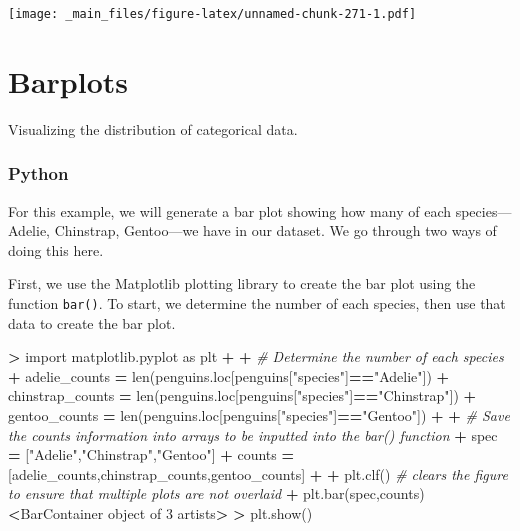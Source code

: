 \documentclass[
]{book}
\newenvironment{Shaded}{\begin{snugshade}}{\end{snugshade}}
\newcommand{\BuiltInTok}[1]{#1}
\newcommand{\CommentTok}[1]{\textcolor[rgb]{0.56,0.35,0.01}{\textit{#1}}}
\newcommand{\DecValTok}[1]{\textcolor[rgb]{0.00,0.00,0.81}{#1}}
\newcommand{\ImportTok}[1]{#1}
\newcommand{\NormalTok}[1]{#1}
\newcommand{\OperatorTok}[1]{\textcolor[rgb]{0.81,0.36,0.00}{\textbf{#1}}}
\newcommand{\StringTok}[1]{\textcolor[rgb]{0.31,0.60,0.02}{#1}}
\begin{document}
\texttt{[image: \_main\_files/figure-latex/unnamed-chunk-271-1.pdf]}

\hypertarget{barplots}{%
\section{Barplots}\label{barplots}}

Visualizing the distribution of categorical data.

\hypertarget{python-42}{%
\subsubsection*{Python}\label{python-42}}

For this example, we will generate a bar plot showing how many of each species---Adelie, Chinstrap, Gentoo---we have in our dataset. We go through two ways of doing this here.

First, we use the Matplotlib plotting library to create the bar plot using the function \texttt{bar()}. To start, we determine the number of each species, then use that data to create the bar plot.

\begin{Shaded}
\begin{Highlighting}[]
\OperatorTok{\textgreater{}} \ImportTok{import}\NormalTok{ matplotlib.pyplot }\ImportTok{as}\NormalTok{ plt }
\OperatorTok{+} 
\OperatorTok{+} \CommentTok{\# Determine the number of each species}
\OperatorTok{+}\NormalTok{ adelie\_counts }\OperatorTok{=} \BuiltInTok{len}\NormalTok{(penguins.loc[penguins[}\StringTok{"species"}\NormalTok{]}\OperatorTok{==}\StringTok{"Adelie"}\NormalTok{])}
\OperatorTok{+}\NormalTok{ chinstrap\_counts }\OperatorTok{=} \BuiltInTok{len}\NormalTok{(penguins.loc[penguins[}\StringTok{"species"}\NormalTok{]}\OperatorTok{==}\StringTok{"Chinstrap"}\NormalTok{])}
\OperatorTok{+}\NormalTok{ gentoo\_counts }\OperatorTok{=} \BuiltInTok{len}\NormalTok{(penguins.loc[penguins[}\StringTok{"species"}\NormalTok{]}\OperatorTok{==}\StringTok{"Gentoo"}\NormalTok{])}
\OperatorTok{+} 
\OperatorTok{+} \CommentTok{\# Save the counts information into arrays to be inputted into the bar() function}
\OperatorTok{+}\NormalTok{ spec }\OperatorTok{=}\NormalTok{ [}\StringTok{"Adelie"}\NormalTok{,}\StringTok{"Chinstrap"}\NormalTok{,}\StringTok{"Gentoo"}\NormalTok{]}
\OperatorTok{+}\NormalTok{ counts }\OperatorTok{=}\NormalTok{ [adelie\_counts,chinstrap\_counts,gentoo\_counts]}
\OperatorTok{+} 
\OperatorTok{+}\NormalTok{ plt.clf() }\CommentTok{\# clears the figure to ensure that multiple plots are not overlaid}
\OperatorTok{+}\NormalTok{ plt.bar(spec,counts)}
\OperatorTok{\textless{}}\NormalTok{BarContainer }\BuiltInTok{object}\NormalTok{ of }\DecValTok{3}\NormalTok{ artists}\OperatorTok{\textgreater{}}
\OperatorTok{\textgreater{}}\NormalTok{ plt.show()}
\end{Highlighting}
\end{Shaded}
\end{document}

